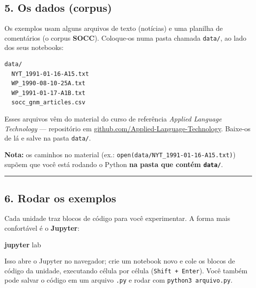 \documentclass[
  brazilian,
  11pt,
]{article}
\newenvironment{Shaded}{\begin{snugshade}}{\end{snugshade}}
\newcommand{\ExtensionTok}[1]{\textcolor[rgb]{0.00,0.60,1.00}{\textbf{#1}}}
\newcommand{\NormalTok}[1]{\textcolor[rgb]{0.81,0.81,0.76}{#1}}
\let\oldtexttt\texttt
\renewcommand{\texttt}[1]{{\color{inlink}\oldtexttt{#1}}}
\begin{document}
\subsection{5. Os dados (corpus)}\label{os-dados-corpus}

Os exemplos usam alguns arquivos de texto (notícias) e uma planilha de
comentários (o corpus \textbf{SOCC}). Coloque‑os numa pasta chamada
\texttt{data/}, ao lado dos seus notebooks:

\begin{verbatim}
data/
  NYT_1991-01-16-A15.txt
  WP_1990-08-10-25A.txt
  WP_1991-01-17-A1B.txt
  socc_gnm_articles.csv
\end{verbatim}

Esses arquivos vêm do material do curso de referência \emph{Applied
Language Technology} --- repositório em
\href{https://github.com/Applied-Language-Technology}{github.com/Applied-Language-Technology}.
Baixe‑os de lá e salve na pasta \texttt{data/}.

\begin{notebox}

\textbf{Nota:} os caminhos no material (ex.:
\texttt{open(\textquotesingle{}data/NYT\_1991-01-16-A15.txt\textquotesingle{})})
supõem que você está rodando o Python \textbf{na pasta que contém
\texttt{data/}}.

\end{notebox}

\begin{center}\rule{0.5\linewidth}{0.5pt}\end{center}

\subsection{6. Rodar os exemplos}\label{rodar-os-exemplos}

Cada unidade traz blocos de código para você experimentar. A forma mais
confortável é o \textbf{Jupyter}:

\begin{Shaded}
\begin{Highlighting}[]
\ExtensionTok{jupyter}\NormalTok{ lab}
\end{Highlighting}
\end{Shaded}

Isso abre o Jupyter no navegador; crie um notebook novo e cole os blocos
de código da unidade, executando célula por célula
(\texttt{Shift\ +\ Enter}). Você também pode salvar o código em um
arquivo \texttt{.py} e rodar com \texttt{python3\ arquivo.py}.
\end{document}
